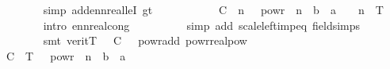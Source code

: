 \begin{isabellebody}
\ \ \ \ \ \ \ \ \isamarkupfalse%
\ {\isacharparenleft}{\kern0pt}simp\ add{\isacharcolon}{\kern0pt}ennreal{\isacharunderscore}{\kern0pt}leI\ gt{\isacharunderscore}{\kern0pt}{}{\isacharparenleft}{\kern0pt}{}{\isacharparenright}{\kern0pt}{\isacharparenright}{\kern0pt}\isanewline
\ \ \ \ \ \ \isamarkupfalse%
\ \isamarkupfalse%
\ {\isachardoublequoteopen}{\isachardot}{\kern0pt}{\isachardot}{\kern0pt}{\isachardot}{\kern0pt}\ {\isacharequal}{\kern0pt}\ C\ {\isacharasterisk}{\kern0pt}\ {}{\isacharslash}{\kern0pt}{\isacharparenleft}{\kern0pt}{}{\isacharcircum}{\kern0pt}n{\isacharparenright}{\kern0pt}\ {\isacharasterisk}{\kern0pt}\ {}\ powr\ {\isacharparenleft}{\kern0pt}{\isacharminus}{\kern0pt}\ n\ {\isacharasterisk}{\kern0pt}\ {\isacharparenleft}{\kern0pt}b\ {\isacharminus}{\kern0pt}\ a\ {\isacharasterisk}{\kern0pt}\ {\isasymgamma}{\isacharparenright}{\kern0pt}{\isacharparenright}{\kern0pt}\ {\isacharasterisk}{\kern0pt}\ {}{\isacharcircum}{\kern0pt}n\ {\isacharasterisk}{\kern0pt}\ T{\isachardoublequoteclose}\isanewline
\ \ \ \ \ \ \ \ \isamarkupfalse%
\ {\isacharparenleft}{\kern0pt}intro\ ennreal{\isacharunderscore}{\kern0pt}cong{\isacharparenright}{\kern0pt}\isanewline
\ \ \ \ \ \ \ \ \isamarkupfalse%
\ {\isacharparenleft}{\kern0pt}simp\ add{\isacharcolon}{\kern0pt}\ scale{\isacharunderscore}{\kern0pt}left{\isacharunderscore}{\kern0pt}imp{\isacharunderscore}{\kern0pt}eq\ field{\isacharunderscore}{\kern0pt}simps{\isacharparenright}{\kern0pt}\isanewline
\ \ \ \ \ \ \ \ \isamarkupfalse%
\ {\isacharparenleft}{\kern0pt}smt\ {\isacharparenleft}{\kern0pt}verit{\isacharparenright}{\kern0pt}{\isacartoucheopen}T\ {\isachargreater}{\kern0pt}\ {}{\isacartoucheclose}\ {\isacartoucheopen}C\ {\isachargreater}{\kern0pt}\ {}{\isacartoucheclose}\ powr{\isacharunderscore}{\kern0pt}add\ powr{\isacharunderscore}{\kern0pt}realpow{\isacharparenright}{\kern0pt}\isanewline
\ \ \ \ \ \ \isamarkupfalse%
\ \isamarkupfalse%
\ {\isachardoublequoteopen}{\isachardot}{\kern0pt}{\isachardot}{\kern0pt}{\isachardot}{\kern0pt}\ {\isacharequal}{\kern0pt}\ C\ {\isacharasterisk}{\kern0pt}\ T\ {\isacharasterisk}{\kern0pt}\ {}\ powr\ {\isacharparenleft}{\kern0pt}{\isacharminus}{\kern0pt}\ n\ {\isacharasterisk}{\kern0pt}\ {\isacharparenleft}{\kern0pt}b\ {\isacharminus}{\kern0pt}\ a\ {\isacharasterisk}{\kern0pt}\ {\isasymgamma}{\isacharparenright}{\kern0pt}{\isacharparenright}{\kern0pt}{\isachardoublequoteclose}\isanewline

\end{isabellebody}
